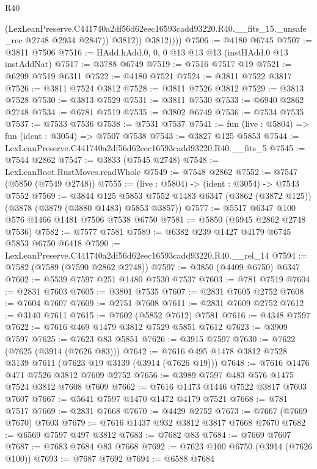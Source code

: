 \begin{lexlean}{R40}
\begin{coremodule}
                  (LexLeanPreserve.C441740a2df56d62eec16593cadd93220.R40.__fits_15._unsafe_rec
                    @2748
                    @2934
                    @2847))
                @3812))
            @3812))))
@7506 := @4180 @6745
@7507 := @3811 @7506
@7516 := HAdd.hAdd.{0, 0, 0} @13 @13 @13 (instHAdd.{0} @13 instAddNat)
@7517 := @3788 @6749
@7519 := @7516 @7517 @19
@7521 := @6299 @7519 @6311
@7522 := @4180 @7521
@7524 := @3811 @7522 @3817
@7526 := @3811 @7524 @3812
@7528 := @3811 @7526 @3812
@7529 := @3813 @7528
@7530 := @3813 @7529
@7531 := @3811 @7530
@7533 := @6940 @2862 @2748
@7534 := @6781 @7519
@7535 := @3802 @6749
@7536 := @7534 @7535
@7537 := @7533 @7536
@7538 := @7531 @7537
@7541 := fun (live : @5804) => fun (ident : @3054) => @7507 @7538
@7543 := @3827 @125 @5853
@7544 := LexLeanPreserve.C441740a2df56d62eec16593cadd93220.R40.__fits_5
@7545 := @7544 @2862
@7547 := @3833 (@7545 @2748)
@7548 := LexLeanBoot.RustMoves.readWhole
@7549 := @7548 @2862
@7552 := @7547 (@5850 (@7549 @2748))
@7555 := (live : @5804) -> (ident : @3054) -> @7543 @7552
@7569 := @3844
    @125
    @5853
    @7552
    @1483
    @6347
    (@3862 (@3872 @125))
    (@3878 (@3879 (@3880 @1483) @5853 @3857))
@7577 := @5517 @6347 @100 @576 @1466 @1481 @7506 @7538 @6750
@7581 := @5850 (@6945 @2862 @2748 @7536)
@7582 := @7577 @7581
@7589 := @6382 @239 @1427 @4179 @6745 @5853 @6750 @6418
@7590 := LexLeanPreserve.C441740a2df56d62eec16593cadd93220.R40.__rel_14
@7594 := @7582 (@7589 (@7590 @2862 @2748))
@7597 := @3850 (@4409 @6750) @6347
@7602 := @5539 @7597 @251 @1480 @7530 @7537
@7603 := @781 @7519
@7604 := @2831 @7603
@7605 := @3801 @7535
@7607 := @2831 @7605 @2752
@7608 := @7604 @7607
@7609 := @2751 @7608
@7611 := @2831 @7609 @2752
@7612 := @3140 @7611
@7615 := @7602 (@5852 @7612) @7581
@7616 := @4348 @7597
@7622 := @7616 @469 @1479 @3812 @7529 @5851 @7612
@7623 := @3909 @7597
@7625 := @7623 @83 @5851
@7626 := @3915 @7597
@7630 := @7622 (@7625 (@3914 (@7626 @83)))
@7642 := @7616 @495 @1478 @3812 @7528 @3139 @7611 (@7623 @19 @3139 (@3914 (@7626 @19)))
@7648 := @7616 @1476 @471 @7526 @3812 @7609 @2752
@7656 := @3989 @7597 @483 @576 @1475 @7524 @3812 @7608 @7609
@7662 := @7616 @1473 @1446 @7522 @3817 @7603 @7607
@7667 := @5641 @7597 @1470 @1472 @4179 @7521
@7668 := @781 @7517
@7669 := @2831 @7668
@7670 := @4429 @2752
@7673 := @7667 (@7669 @7670) @7603
@7679 := @7616 @1437 @932 @3812 @3817 @7668 @7670
@7682 := @6569 @7597 @497 @3812
@7683 := @7682 @83
@7684 := @7669 @7607
@7687 := @7683 @7684 @83 @7668
@7692 := @7623 @100 @6750 (@3914 (@7626 @100))
@7693 := @7687 @7692
@7694 := @6588 @7684

\end{coremodule}
\end{lexlean}
